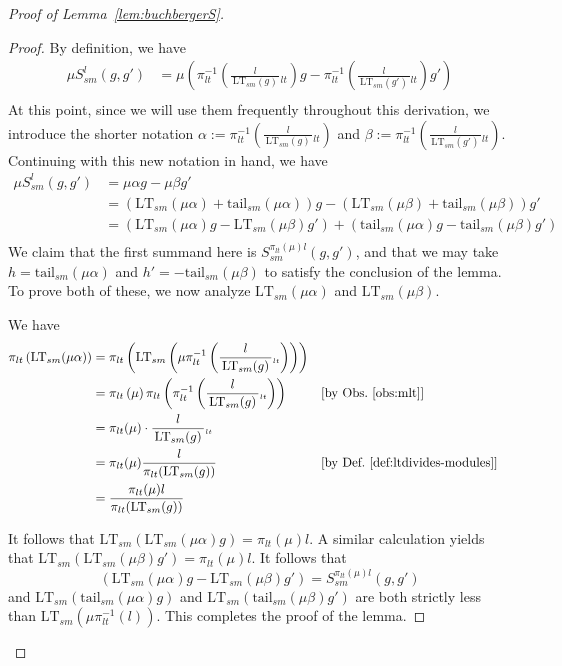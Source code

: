 \documentclass[11pt,reqno]{amsart}
\newcommand*{\eqcomment}[2][\qquad]{#1 &&\text{[#2]}}
\newcommand*{\eqcommentnear}[1]{&&\text{[#1]}}
\newcommand{\ltfrac}[2]{\frac{\,#1\,}{\,#2\,}{}_{{\scriptscriptstyle lt}}}
\newcommand{\tail}{\text{tail}_{sm}}
\newcommand{\ltsm}{\text{LT}_{sm}}
\newcommand{\Ssm}{S_{sm}}
\theoremstyle{definition}
\numberwithin{equation}{section}
\begin{document}
\begin{proof}[Proof of Lemma~\ref{lem:buchbergerS}]
\begin{proof}
By definition, we have
\begin{align*}
\mu \Ssm^{l}(g, g') & = \mu\left(\pi_{lt}^{-1}\left(\ltfrac{l}{\ltsm(g)}\right) g - \pi_{lt}^{-1}\left(\ltfrac{l}{\ltsm(g')}\right) g' \right) \\
 \end{align*}
 At this point, since we will use them frequently throughout this derivation, we introduce the shorter notation $\alpha := \pi_{lt}^{-1}\left(\ltfrac{l}{\ltsm(g)}\right)$ and $\beta := \pi_{lt}^{-1}\left(\ltfrac{l}{\ltsm(g')}\right)$. Continuing with this new notation in hand, we have
\begin{align}
 \mu \Ssm^{l}(g, g') & = \mu \alpha g - \mu \beta g' \nonumber \\
  & = \left(\ltsm(\mu \alpha) + \tail(\mu \alpha) \right) g - \left(\ltsm(\mu \beta) + \tail(\mu \beta) \right) g' \nonumber \\
  & = \left(\ltsm(\mu \alpha) g - \ltsm(\mu \beta) g'\right) + \left(\tail(\mu \alpha) g - \tail(\mu \beta) g'\right)  \label{eq:mussm}\\
\end{align}
We claim that the first summand here is $\Ssm^{\pi_{lt}(\mu) l}(g,g')$, and that we may take $h = \tail(\mu \alpha)$ and $h' = -\tail(\mu \beta)$ to satisfy the conclusion of the lemma. To prove both of these, we now analyze $\ltsm(\mu \alpha)$ and $\ltsm(\mu \beta)$.

We have
\begin{align*}
\pi_{lt}\left(\ltsm(\mu \alpha)\right) & = \pi_{lt}\left(\ltsm\left(\mu \pi_{lt}^{-1}\left(\ltfrac{l}{\ltsm(g)} \right) \right)\right) \\
 & = \pi_{lt}\left( \mu \right) \pi_{lt}\left( \pi_{lt}^{-1}\left(\ltfrac{l}{\ltsm(g)} \right)\right)  \eqcommentnear{by Obs.~\ref{obs:mlt}} \\
 & = \pi_{lt}(\mu) \cdot \ltfrac{l}{\ltsm(g)} \\
 & = \pi_{lt}(\mu) \frac{l}{\pi_{lt}(\ltsm(g))} \eqcomment{by Def.~\ref{def:ltdivides-modules}} \\
& = \frac{\pi_{lt}(\mu) l}{\pi_{lt}(\ltsm(g))} 
\end{align*}

It follows that $\ltsm(\ltsm(\mu \alpha) g) = \pi_{lt}(\mu) l$. A similar calculation yields that $\ltsm(\ltsm(\mu \beta) g') = \pi_{lt}(\mu) l$. It follows that
\[
\left(\ltsm(\mu \alpha) g - \ltsm(\mu \beta) g'\right) = \Ssm^{\pi_{lt}(\mu) l}(g,g')
\]
and $\ltsm(\tail(\mu \alpha) g)$ and $\ltsm(\tail(\mu \beta) g')$ are both strictly less than $\ltsm(\mu \pi_{lt}^{-1}(l))$. This completes the proof of the lemma.
\end{proof}


\end{proof}
\end{document}
